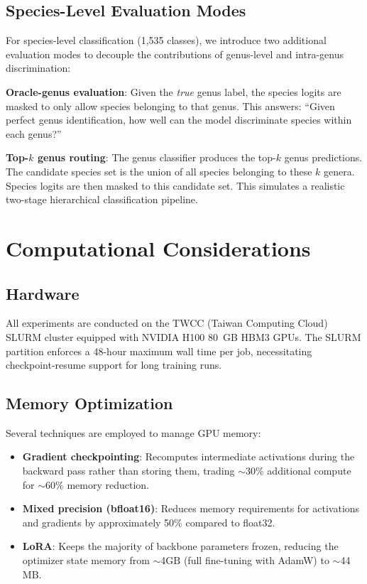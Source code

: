 \subsection{Species-Level Evaluation Modes}
\label{sec:method-species-eval}

For species-level classification (1,535 classes), we introduce two additional evaluation modes to decouple the contributions of genus-level and intra-genus discrimination:

\textbf{Oracle-genus evaluation}: Given the \emph{true} genus label, the species logits are masked to only allow species belonging to that genus. This answers: ``Given perfect genus identification, how well can the model discriminate species within each genus?''

\textbf{Top-$k$ genus routing}: The genus classifier produces the top-$k$ genus predictions. The candidate species set is the union of all species belonging to these $k$ genera. Species logits are then masked to this candidate set. This simulates a realistic two-stage hierarchical classification pipeline.

\section{Computational Considerations}
\label{sec:method-compute}

\subsection{Hardware}

All experiments are conducted on the TWCC (Taiwan Computing Cloud) SLURM cluster equipped with NVIDIA H100 80~GB HBM3 GPUs. The SLURM partition enforces a 48-hour maximum wall time per job, necessitating checkpoint-resume support for long training runs.

\subsection{Memory Optimization}

Several techniques are employed to manage GPU memory:
\begin{itemize}
    \item \textbf{Gradient checkpointing}: Recomputes intermediate activations during the backward pass rather than storing them, trading $\sim$30\% additional compute for $\sim$60\% memory reduction.
    \item \textbf{Mixed precision (bfloat16)}: Reduces memory requirements for activations and gradients by approximately 50\% compared to float32.
    \item \textbf{LoRA}: Keeps the majority of backbone parameters frozen, reducing the optimizer state memory from $\sim$4$\text{GB}$ (full fine-tuning with AdamW) to $\sim$44$\text{MB}$.
\end{itemize}

